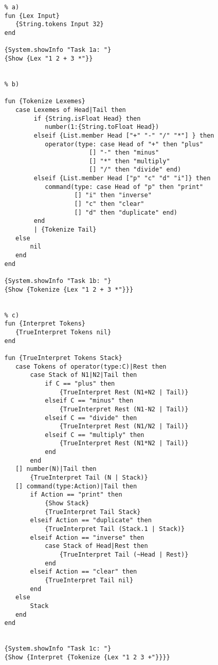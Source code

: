 \documentclass[11pt,a4paper]{report}
\begin{document}
\begin{lstlisting}[language=Oz]
   % Task 1
   % a)
   fun {Lex Input}
      {String.tokens Input 32}
   end
   
   {System.showInfo "Task 1a: "}
   {Show {Lex "1 2 + 3 *"}}
   
   
   % b)
   
   fun {Tokenize Lexemes}
      case Lexemes of Head|Tail then 
           if {String.isFloat Head} then
              number(1:{String.toFloat Head}) 
           elseif {List.member Head ["+" "-" "/" "*"] } then 
              operator(type: case Head of "+" then "plus" 
                          [] "-" then "minus" 
                          [] "*" then "multiply" 
                          [] "/" then "divide" end) 
           elseif {List.member Head ["p" "c" "d" "i"]} then
              command(type: case Head of "p" then "print" 
                      [] "i" then "inverse" 
                      [] "c" then "clear" 
                      [] "d" then "duplicate" end)
           end
           | {Tokenize Tail}
      else 
          nil
      end
   end
   
   {System.showInfo "Task 1b: "}
   {Show {Tokenize {Lex "1 2 + 3 *"}}}
   
   
   % c)
   fun {Interpret Tokens}
      {TrueInterpret Tokens nil}
   end
   
   fun {TrueInterpret Tokens Stack}
      case Tokens of operator(type:C)|Rest then
          case Stack of N1|N2|Tail then
              if C == "plus" then
                  {TrueInterpret Rest (N1+N2 | Tail)}
              elseif C == "minus" then
                  {TrueInterpret Rest (N1-N2 | Tail)}
              elseif C == "divide" then
                  {TrueInterpret Rest (N1/N2 | Tail)}
              elseif C == "multiply" then
                  {TrueInterpret Rest (N1*N2 | Tail)}
              end
          end
      [] number(N)|Tail then
          {TrueInterpret Tail (N | Stack)}
      [] command(type:Action)|Tail then
          if Action == "print" then
              {Show Stack}
              {TrueInterpret Tail Stack}
          elseif Action == "duplicate" then
              {TrueInterpret Tail (Stack.1 | Stack)}
          elseif Action == "inverse" then
              case Stack of Head|Rest then
                  {TrueInterpret Tail (~Head | Rest)}
              end
          elseif Action == "clear" then
              {TrueInterpret Tail nil}
          end
      else
          Stack
      end
   end
   
   
   {System.showInfo "Task 1c: "}
   {Show {Interpret {Tokenize {Lex "1 2 3 +"}}}}
   

\end{lstlisting}
\end{document}
